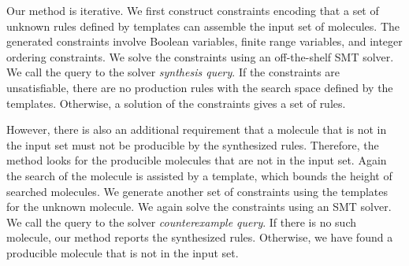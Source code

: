 
Our method is iterative.
We first construct constraints encoding that a set of unknown rules
defined by templates can assemble the input set of molecules.
The generated constraints involve Boolean variables, finite range variables, and integer ordering
constraints.
We solve the constraints using an off-the-shelf SMT solver.
We call the query to the solver {\em synthesis query}.
If the constraints are unsatisfiable, there are no production rules with the search space
defined by the templates.
Otherwise, a solution of the constraints gives a set of rules.

However, there is also an additional requirement that a molecule
that is not in the input set must not be producible by the synthesized rules.
Therefore, the method looks for the producible molecules that are not in the input set.
Again the search of the molecule is assisted by a template, which bounds the height
of searched molecules.
We generate another set of constraints using the templates for the unknown molecule.
We again solve the constraints using an SMT solver.
We call the query to the solver {\em counterexample query}.
If there is no such molecule, our method reports
the synthesized rules.
Otherwise, we have found a producible molecule that is not in the input set.

